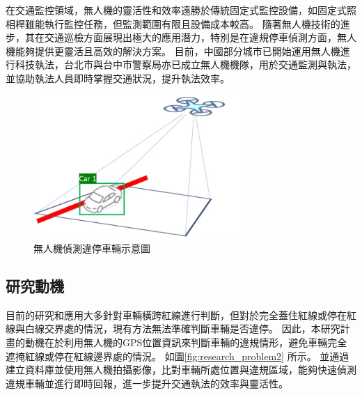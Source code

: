 \documentclass[12pt]{article}       %
\renewcommand{\figurename}{圖}                           %
\begin{document}
在交通監控領域，無人機的靈活性和效率遠勝於傳統固定式監控設備，如固定式照相桿雖能執行監控任務，但監測範圍有限且設備成本較高。
隨著無人機技術的進步，其在交通巡檢方面展現出極大的應用潛力，特別是在違規停車偵測方面，無人機能夠提供更靈活且高效的解決方案。
目前，中國部分城市已開始運用無人機進行科技執法\cite{chinatimes2019}，台北市與台中市警察局亦已成立無人機機隊\cite{cna_2022}\cite{tai_2021}，用於交通監測與執法，並協助執法人員即時掌握交通狀況，提升執法效率。

\begin{figure}[htbp]
    \centering
    \renewcommand{\figurename}{圖} %
    \includegraphics[width=0.7\textwidth]{research_problem1.jpg}     %
    \caption{無人機偵測違停車輛示意圖}    %
    \label{fig:research_problem1}    %
\end{figure}

\subsection{研究動機} 
\hspace{2em}目前的研究和應用大多針對車輛橫跨紅線進行判斷，但對於完全蓋住紅線或停在紅線與白線交界處的情況，現有方法無法準確判斷車輛是否違停。
因此，本研究計畫的動機在於利用無人機的GPS位置資訊來判斷車輛的違規情形，避免車輛完全遮掩紅線或停在紅線邊界處的情況。
如圖\ref{fig:research_problem2} 所示。
並通過建立資料庫並使用無人機拍攝影像，比對車輛所處位置與違規區域，能夠快速偵測違規車輛並進行即時回報，進一步提升交通執法的效率與靈活性。
\end{document}
